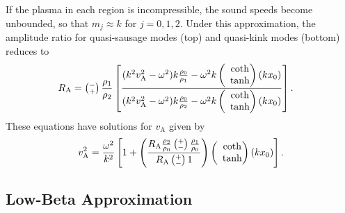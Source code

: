 \documentclass[namedreferences]{solarphysics}
\numberwithin{equation}{section}
\begin{document}
\begin{article}
If the plasma in each region is incompressible, the sound speeds become unbounded, so that $m_j \approx k$ for $j = 0,1,2$. Under this approximation, the amplitude ratio for quasi-sausage modes (top) and quasi-kink modes (bottom) reduces to
\begin{align}
R_\textrm{A} &= \left(\substack{- \\ +}\right) \frac{\rho_1}{\rho_2} \left[ \frac{(k^2v_\textrm{A}^2-\omega^2)k\frac{\rho_0}{\rho_1}-\omega^2k \left(\hspace{-0.07in}\begin{matrix} &\coth \\ &\tanh \end{matrix}\right)(kx_0)}{(k^2v_\textrm{A}^2-\omega^2)k\frac{\rho_0}{\rho_2}-\omega^2k \left(\hspace{-0.07in}\begin{matrix} &\coth \\ &\tanh \end{matrix}\right)(kx_0)} \right].
\end{align}
These equations have solutions for $v_\textrm{A}$ given by
\begin{equation}
v_\textrm{A}^2 = \frac{\omega^2}{k^2} \left[ 1 + \left( \frac{R_\textrm{A} \frac{\rho_2}{\rho_0} \left(\substack{+ \\ -}\right) \frac{\rho_1}{\rho_0}}{R_\textrm{A} \left(\substack{+ \\ -}\right) 1} \right) \left(\hspace{-0.07in}\begin{matrix} &\coth \\ &\tanh \end{matrix}\right) (kx_0)\right].
\end{equation}

\subsection{Low-Beta Approximation} \label{sec: AR low-beta}


\end{article}
\end{document}
